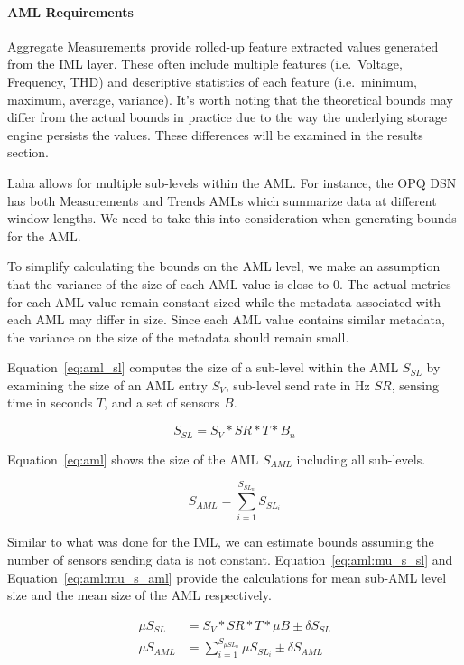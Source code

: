 \paragraph{AML Requirements}
Aggregate Measurements provide rolled-up feature extracted values generated from the IML layer. These often include multiple features (i.e.\ Voltage, Frequency, THD) and descriptive statistics of each feature (i.e.\ minimum, maximum, average, variance). It's worth noting that the theoretical bounds may differ from the actual bounds in practice due to the way the underlying storage engine persists the values. These differences will be examined in the results section.

Laha allows for multiple sub-levels within the AML. For instance, the OPQ DSN has both Measurements and Trends AMLs which summarize data at different window lengths. We need to take this into consideration when generating bounds for the AML\@.

To simplify calculating the bounds on the AML level, we make an assumption that the variance of the size of each AML value is close to 0. The actual metrics for each AML value remain constant sized while the metadata associated with each AML may differ in size. Since each AML value contains similar metadata, the variance on the size of the metadata should remain small.

Equation~\ref{eq:aml_sl} computes the size of a sub-level within the AML $S_{SL}$ by examining the size of an AML entry $S_{V}$, sub-level send rate in Hz $SR$, sensing time in seconds $T$, and a set of sensors $B$.

\begin{equation}\label{eq:aml_sl}
	S_{SL} = S_{V} * SR * T * B_{n}
\end{equation}

Equation~\ref{eq:aml} shows the size of the AML $S_{AML}$ including all sub-levels.

\begin{equation}\label{eq:aml}
	S_{AML} = \sum_{i=1}^{S_{SL_{n}}} S_{SL_{i}}
\end{equation}

Similar to what was done for the IML, we can estimate bounds assuming the number of sensors sending data is not constant. Equation~\ref{eq:aml:mu_s_sl} and Equation~\ref{eq:aml:mu_s_aml} provide the calculations for mean sub-AML level size and the mean size of the AML respectively.

\begin{align}
	\mu S_{SL} &= S_{V} * SR * T * \mu B \pm \delta S_{SL} \label{eq:aml:mu_s_sl} \\
	\mu S_{AML} &= \sum_{i=1}^{S_{\mu SL_{n}}} \mu S_{SL_{i}} \pm \delta S_{AML} \label{eq:aml:mu_s_aml}
\end{align}

